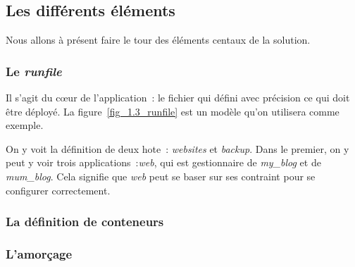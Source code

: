 \subsection{Les différents éléments}

Nous allons à présent faire le tour des éléments centaux de la solution.

\subsubsection{Le \emph{runfile}}



Il s'agit du cœur de l'application~: le fichier qui défini avec précision ce qui doit être déployé.
La figure~\ref{fig_1.3_runfile} est un modèle qu'on utilisera comme exemple.

On y voit la définition de deux \gls{hote}~: \emph{websites} et \emph{backup}.
Dans le premier, on y peut y voir trois \glspl{application}~:\emph{web}, qui est \gls{gestionnaire} de \emph{my\_blog} et de \emph{mum\_blog}.
Cela signifie que \emph{web} peut se baser sur ses \gls{contraint} pour se configurer correctement.
\subsubsection{La définition de conteneurs}

\subsubsection{L'amorçage}
